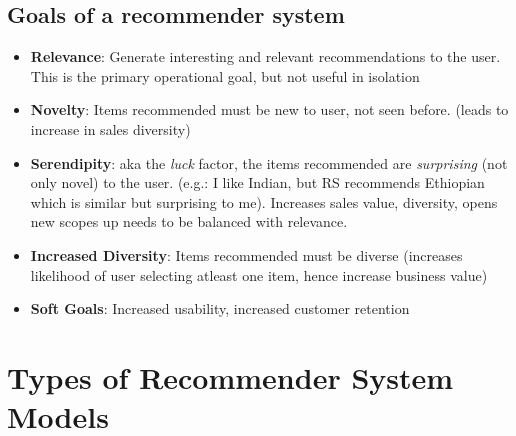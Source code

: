 \documentclass{article}
\begin{document}
\subsection{Goals of a recommender system}
\begin{itemize}
    \item \textbf{Relevance}: Generate interesting and relevant recommendations to the user. This is the primary operational goal, but not useful in isolation
    
    \item \textbf{Novelty}: Items recommended must be new to user, not seen before. (leads to increase in sales diversity) 
    
    \item \textbf{Serendipity}: aka the \textit{luck} factor, the items recommended are \textit{surprising} (not only novel) to the user. (e.g.: I like Indian, but RS recommends Ethiopian which is similar but surprising to me). Increases sales value, diversity, opens new scopes up needs to be balanced with relevance.
    
    \item \textbf{Increased Diversity}: Items recommended must be diverse (increases likelihood of user selecting atleast one item, hence increase business value)
    
    \item \textbf{Soft Goals}: Increased usability, increased customer retention
\end{itemize}

\section{Types of Recommender System Models}
\end{document}
